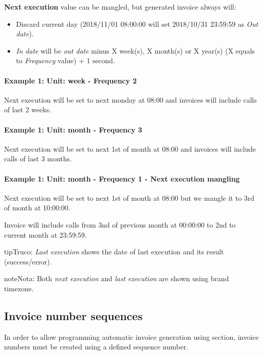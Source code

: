 \documentclass[letterpaper,10pt,spanish]{sphinxmanual}
\begin{document}
\textbf{Next execution} value can be mangled, but generated invoice always will:
\begin{itemize}
\item {} 
Discard current day (2018/11/01 08:00:00 will set 2018/10/31 23:59:59 as \emph{Out date}).

\item {} 
\emph{In date} will be \emph{out date} minus X week(s), X month(s) or X year(s) (X equals to \emph{Frequency} value) + 1 second.

\end{itemize}
\paragraph{Example 1: Unit: week - Frequency 2}

Next execution will be set to next monday at 08:00 and invoices will include calls of last 2 weeks.
\paragraph{Example 1: Unit: month - Frequency 3}

Next execution will be set to next 1st of month at 08:00 and invoices will include calls of last 3 months.
\paragraph{Example 1: Unit: month - Frequency 1 - Next execution mangling}

Next execution will be set to next 1st of month at 08:00 but we mangle it to 3rd of month at 10:00:00.

Invoice will include calls from 3nd of previous month at 00:00:00 to 2nd to current month at 23:59:59.

\begin{notice}{tip}{Truco:}
\emph{Last execution} shows the date of last execution and its result (success/error).
\end{notice}

\begin{notice}{note}{Nota:}
Both \emph{next execution} and \emph{last execution} are shown using brand timezone.
\end{notice}


\subsection{Invoice number sequences}
\label{administration_portal/brand/invoicing/invoice_number_sequences:invoice-number-sequences}\label{administration_portal/brand/invoicing/invoice_number_sequences::doc}
In order to allow programming automatic invoice generation using {\hyperref[administration_portal/brand/invoicing/invoice_schedulers:invoice\string-schedulers]{}} section, invoice
numbers must be created using a defined sequence number.
\end{document}
